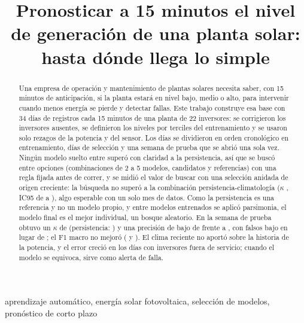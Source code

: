 \documentclass[conference]{IEEEtran}
\begin{document}
\title{Pronosticar a 15 minutos el nivel de generaci\'on de una planta solar:\\ hasta d\'onde llega lo simple}

\author{
}

\maketitle

\begin{abstract}
Una empresa de operaci\'on y mantenimiento de plantas solares necesita saber, con 15 minutos de anticipaci\'on, si la planta estar\'a en nivel bajo, medio o alto, para intervenir cuando menos energ\'ia se pierde y detectar fallas. Este trabajo construye esa base con 34 d\'ias de registros cada 15 minutos de una planta de 22 inversores: se corrigieron los inversores ausentes, se definieron los niveles por terciles del entrenamiento y se usaron solo rezagos de la potencia y del sensor. Los d\'ias se dividieron en orden cronol\'ogico en entrenamiento, \ndiassel{} d\'ias de selecci\'on y una semana de prueba que se abri\'o una sola vez. Ning\'un modelo suelto entre \ncandidatos{} super\'o con claridad a la persistencia, as\'i que se busc\'o entre \nopciones{} opciones (combinaciones de 2 a 5 modelos, candidatos y referencias) con una regla fijada antes de correr, y se midi\'o el valor de buscar con una selecci\'on anidada de origen creciente: la b\'usqueda no super\'o a la combinaci\'on persistencia-climatolog\'ia ($\kappa$ \anidKappa{}, IC95 de \anidKappaLo{} a \anidKappaHi{}), algo esperable con un solo mes de datos. Como la persistencia es una referencia y no un modelo propio, y entre modelos entrenados se aplic\'o parsimonia, el modelo final es el mejor individual, un bosque aleatorio. En la semana de prueba obtuvo un $\kappa$ de \tFinKappa{} (persistencia: \tPersKappa{}) y una precisi\'on de bajo de \tFinPrec{} frente a \tPersPrec{}, con \tFinFalsosBajo{} falsos bajo en lugar de \tPersFalsosBajo{}; el F1 macro no mejor\'o (\tFinFmacro{} y \tPersFmacro{}). El clima reciente no aport\'o sobre la historia de la potencia, y el error creci\'o en los d\'ias con inversores fuera de servicio; cuando el modelo se equivoca, sirve como alerta de falla.
\end{abstract}

\begin{IEEEkeywords}
aprendizaje autom\'atico, energ\'ia solar fotovoltaica, selecci\'on de modelos, pron\'ostico de corto plazo
\end{IEEEkeywords}
\end{document}
